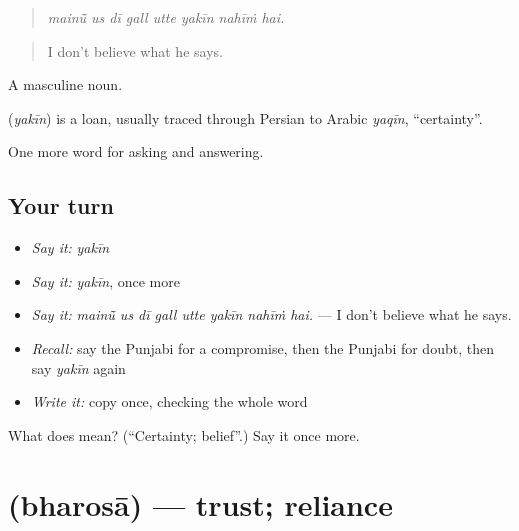 \begin{quote}
       
\end{quote}

\begin{quote}
\emph{mainū̃ us dī gall utte yakīn nahīṁ hai.}
\end{quote}

\begin{quote}
I don't believe what he says.
\end{quote}

A masculine noun.

\begin{cousinweb}
\textbf{} (\emph{yakīn}) is a loan, usually traced through Persian to Arabic \emph{yaqīn}, \textquotedblleft{}certainty\textquotedblright{}.
\end{cousinweb}

\begin{grammarlens}[title={What you've built}]
One more word for asking and answering.
\end{grammarlens}

\subsection*{Your turn}
\begin{itemize}
\raggedright
  \item \emph{Say it:} \emph{yakīn}
  \item \emph{Say it:} \emph{yakīn}, once more
  \item \emph{Say it:} \emph{mainū̃ us dī gall utte yakīn nahīṁ hai.} — I don't believe what he says.
  \item \emph{Recall:} say the Punjabi for a compromise, then the Punjabi for doubt, then say \emph{yakīn} again
  \item \emph{Write it:} copy \textbf{} once, checking the whole word
\end{itemize}

\begin{tcolorbox}[breakable,colback=teal!4,colframe=teal!35!black,title={Before you move on}]
What does  mean? (\textquotedblleft{}Certainty; belief\textquotedblright{}.) Say it once more.
\end{tcolorbox}
\section[\texorpdfstring{\pa{ਭਰੋਸਾ} (bharosā)}{ਭਰੋਸਾ (bharosā)}]{ (bharosā) — trust; reliance}

